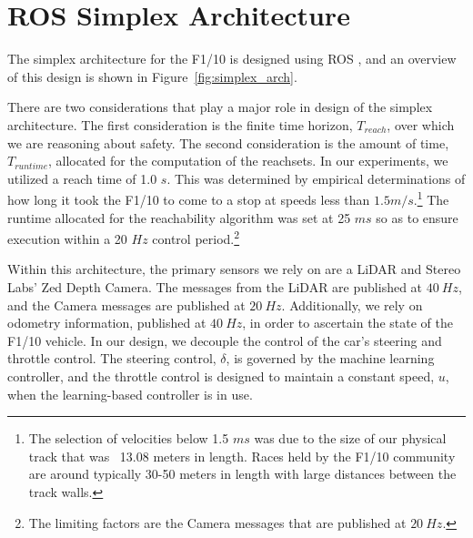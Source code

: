 \documentclass[manuscript,screen,review]{acmart}
\newcommand{\figref}[1]{Figure~\ref{#1}}
\begin{document}
\section{ROS Simplex Architecture}

\label{section:simplex}
The simplex architecture for the F1/10 is designed using ROS \cite{ROS}, and an overview of this design is shown in \figref{fig:simplex_arch}. 

There are two considerations that play a major role in design of the simplex architecture. The first consideration is the finite time horizon, $T_{reach}$, over which we are reasoning about safety. The second consideration is the amount of time, $T_{runtime}$, allocated for the computation of the reachsets. In our experiments, we utilized a reach time of 1.0 $s$. This was determined by empirical determinations of how long it took the F1/10 to come to a stop at speeds less than $1.5 m/s.$\footnote{The selection of velocities below 1.5 $ms$ was due to the size of our physical track that was ~13.08 meters in length. Races held by the F1/10 community are around typically 30-50 meters in length with large distances between the track walls.} The runtime allocated for the reachability algorithm was set at 25 $ms$ so as to ensure execution within a 20 $Hz$ control period.\footnote{The limiting factors are the Camera messages that are published at $20 \ Hz$.}  

Within this architecture, the primary sensors we rely on are a LiDAR and Stereo Labs' Zed Depth Camera. The messages from the LiDAR are published at $40 \ Hz$, and the Camera messages are published at $20 \ Hz$. Additionally, we rely on odometry information, published at $40 \ Hz$, in order to ascertain the state of the F1/10 vehicle. In our design, we decouple the control of the car's steering and throttle control. The steering control, $\delta$, is governed by the machine learning controller, and the throttle control is designed to maintain a constant speed, $u$, when the learning-based controller is in use. 

\end{document}
